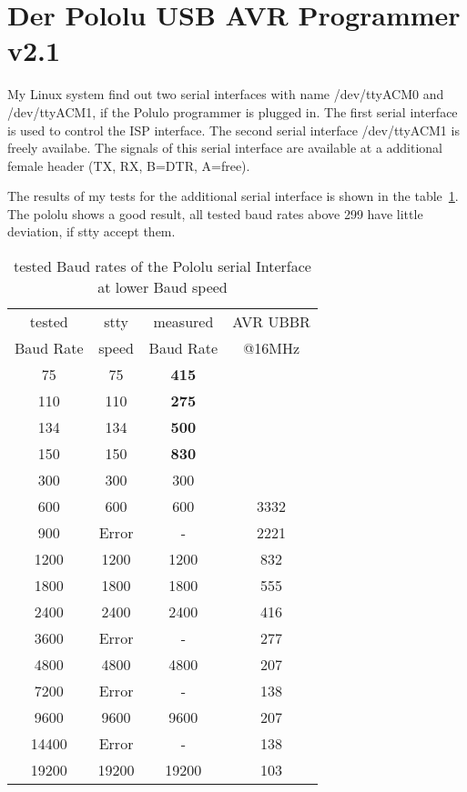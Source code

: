 \section{Der Pololu USB AVR Programmer v2.1}

My Linux system find out two serial interfaces with name /dev/ttyACM0 and /dev/ttyACM1,
if the Polulo programmer is plugged in.
The first serial interface is used to control the ISP interface.
The second serial interface /dev/ttyACM1 is freely availabe.
The signals of this serial interface are available at a additional
female header (TX, RX, B=DTR, A=free).

The results of my tests for the additional serial interface is
shown in the table~\ref{tab:pololubaudl}.
The pololu shows a good result, all tested baud rates above 299 have little deviation, if stty accept them.

\begin{table}[H]
  \begin{center}
    \begin{tabular}{| c | c | c || c |}
    \hline
    tested     & stty  & measured  & AVR UBBR  \\
    Baud Rate   & speed & Baud Rate  & @16MHz \\
    \hline
    \hline
         75    &  75   & \bf{415} &         \\
    \hline
        110    &  110  & \bf{275}  &         \\
    \hline
        134    &  134  & \bf{500} &        \\
    \hline
        150    & 150   & \bf{830} &         \\
    \hline
        300    & 300   & 300      &        \\
    \hline
        600    & 600   &  600     &   3332  \\
    \hline
        900    & Error &   -      &   2221 \\
    \hline
       1200    & 1200  &  1200    &    832  \\
    \hline
       1800    & 1800  &  1800    &    555 \\
    \hline
       2400    & 2400  &  2400    &    416  \\
    \hline
       3600    & Error &    -     &    277  \\
    \hline
       4800    & 4800  &  4800    &    207  \\
    \hline
       7200    & Error &    -     &    138  \\
    \hline
       9600    & 9600  &   9600   &    207  \\
    \hline
      14400    & Error &    -     &    138  \\
    \hline
      19200    & 19200  &  19200  &    103  \\
    \hline
    \end{tabular}
  \end{center}
  \caption{tested Baud rates of the Pololu serial Interface at lower Baud speed}
  \label{tab:pololubaudl}
\end{table}


